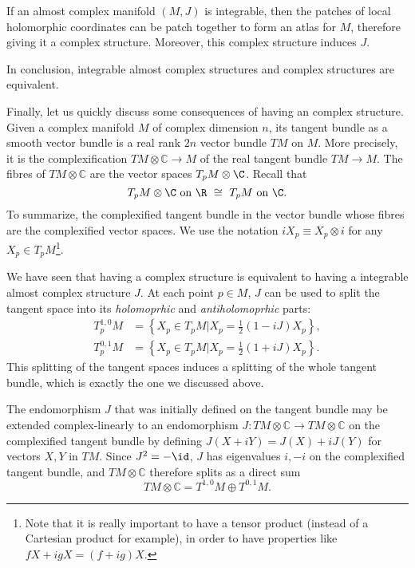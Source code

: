 \documentclass{worksheetclass}
\begin{document}
        \begin{prop}
            If an almost complex manifold $(M,J)$ is integrable, then the patches of local holomorphic coordinates can be patch together to form an atlas for $M$, therefore giving it a complex structure. Moreover, this complex structure induces $J$.
        \end{prop}

        \begin{result}
            In conclusion, integrable almost complex structures and complex structures are equivalent.
        \end{result}

        Finally, let us quickly discuss some consequences of having an complex structure. Given a complex manifold $M$ of complex dimension $n$, its tangent bundle as a smooth vector bundle is a real rank $2n$ vector bundle $TM$ on $M$. More precisely, it is the complexification $\displaystyle TM\otimes \mathbb{C} \to M$ of the real tangent bundle $\displaystyle TM \to M$. The fibres of $TM\otimes \mathbb{C}$ are the vector spaces $T_pM\otimes\C$. Recall that
        \begin{equation*}
            T_pM\otimes \C\text{ on }\R ~\cong~ T_pM\text{ on }\C.
        \end{equation*}
        To summarize, the complexified tangent bundle in the vector bundle whose fibres are the complexified vector spaces. We use the notation $iX_p\equiv X_p\otimes i$ for any $X_p\in T_pM$\footnote{Note that it is really important to have a tensor product (instead of a Cartesian product for example), in order to have properties like $fX+igX = (f+ig)X$.}. 
        
        We have seen that having a complex structure is equivalent to having a integrable almost complex structure $J$. At each point $p\in M$, $J$ can be used to split the tangent space into its  \emph{holomoprhic} and \emph{antiholomoprhic} parts:
        \begin{align*}
                T^{1,0}_pM &= \left\{X_p\in T_pM|X_p=\frac{1}{2}(1-iJ)X_p\right\},\\
                T^{0,1}_pM &= \left\{X_p\in T_pM|X_p=\frac{1}{2}(1+iJ)X_p\right\}.
        \end{align*}
        This splitting of the tangent spaces induces a splitting of the whole tangent bundle, which is exactly the one we discussed above.
        
        The endomorphism $J$ that was initially defined on the tangent bundle may be extended complex-linearly to an endomorphism $J:TM\otimes \mathbb{C} \to TM\otimes \mathbb{C}$ on the complexified tangent bundle by defining $J(X+iY)=J(X)+iJ(Y)$ for vectors $X,Y$ in $TM$. Since $J^2=-\id$, $J$ has eigenvalues $i,-i$ on the complexified tangent bundle, and $TM\otimes \mathbb{C}$ therefore splits as a direct sum 
        \begin{equation}
            TM\otimes \mathbb{C} =T^{1,0}M\oplus T^{0,1}M.
        \end{equation}
\end{document}
